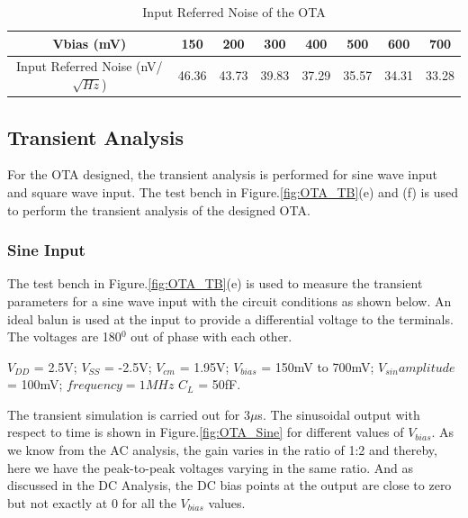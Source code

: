 \begin{table} [H]
\centering
\begin{tabular}{@{}cccccccc@{}}
\toprule
Vbias (mV)					& 150			& 200			& 300			& 400			& 500			& 600			& 700 \\ \midrule
Input Referred Noise (nV/$\sqrt{Hz}$)			& 46.36		& 43.73		& 39.83		& 37.29		& 35.57		& 34.31		& 33.28 \\
\bottomrule
\end{tabular}
\caption{Input Referred Noise of the OTA}
\label{tab:OTA_Noise}
\end{table}

\subsection{Transient Analysis}
For the OTA designed, the transient analysis is performed for sine wave input and square wave input. The test bench in Figure.\ref{fig:OTA_TB}(e) and (f) is used to perform the transient analysis of the designed OTA.

\subsubsection{Sine Input}
The test bench in Figure.\ref{fig:OTA_TB}(e) is used to measure the transient parameters for a sine wave input with the circuit conditions as shown below. An ideal balun is used at the input to provide a differential voltage to the terminals. The voltages are 180$^0$ out of phase with each other. 

$V_{DD}$ = 2.5V; $V_{SS}$ = -2.5V; $V_{cm}$ = 1.95V; $V_{bias}$ = 150mV to 700mV;  $V_{sin} amplitude$ = 100mV; $frequency = 1MHz$ $C_{L}$ = 50fF.

The transient simulation is carried out for 3$\mu $s. The sinusoidal output with respect to time is shown in Figure.\ref{fig:OTA_Sine} for different values of $V_{bias}$. As we know from the AC analysis, the gain varies in the ratio of 1:2 and thereby, here we have the peak-to-peak voltages varying in the same ratio. And as discussed in the DC Analysis, the DC bias points at the output are close to zero but not exactly at 0 for all the $V_{bias}$ values.

